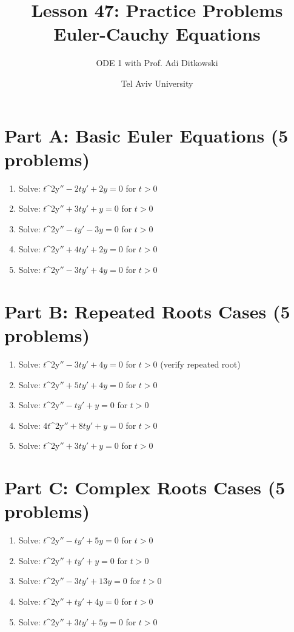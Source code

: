\documentclass[12pt]{article}
\title{Lesson 47: Practice Problems\\Euler-Cauchy Equations}
\author{ODE 1 with Prof. Adi Ditkowski}
\date{Tel Aviv University}
\begin{document}
\maketitle

\section*{Part A: Basic Euler Equations (5 problems)}

\begin{enumerate}
\item Solve: $t$^{2y}$'' - 2ty' + 2y = 0$ for $t > 0$

\item Solve: $t$^{2y}$'' + 3ty' + y = 0$ for $t > 0$

\item Solve: $t$^{2y}$'' - ty' - 3y = 0$ for $t > 0$

\item Solve: $t$^{2y}$'' + 4ty' + 2y = 0$ for $t > 0$

\item Solve: $t$^{2y}$'' - 3ty' + 4y = 0$ for $t > 0$
\end{enumerate}

\section*{Part B: Repeated Roots Cases (5 problems)}

\begin{enumerate}[resume]
\item Solve: $t$^{2y}$'' - 3ty' + 4y = 0$ for $t > 0$ (verify repeated root)

\item Solve: $t$^{2y}$'' + 5ty' + 4y = 0$ for $t > 0$

\item Solve: $t$^{2y}$'' - ty' + y = 0$ for $t > 0$

\item Solve: $4t$^{2y}$'' + 8ty' + y = 0$ for $t > 0$

\item Solve: $t$^{2y}$'' + 3ty' + y = 0$ for $t > 0$
\end{enumerate}

\section*{Part C: Complex Roots Cases (5 problems)}

\begin{enumerate}[resume]
\item Solve: $t$^{2y}$'' - ty' + 5y = 0$ for $t > 0$

\item Solve: $t$^{2y}$'' + ty' + y = 0$ for $t > 0$

\item Solve: $t$^{2y}$'' - 3ty' + 13y = 0$ for $t > 0$

\item Solve: $t$^{2y}$'' + ty' + 4y = 0$ for $t > 0$

\item Solve: $t$^{2y}$'' + 3ty' + 5y = 0$ for $t > 0$
\end{enumerate}
\end{document}
